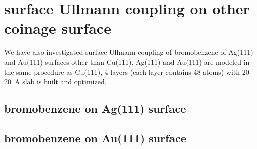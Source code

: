 \section{surface Ullmann coupling on other coinage surface}
We have also investigated surface Ullmann coupling of bromobenzene of Ag(111) and Au(111) surfaces other than Cu(111). Ag(111) and Au(111) are modeled in the same procedure as Cu(111), 4 layers (each layer contains 48 atoms) with 20 \SI{20}{\angstrom} slab is built and optimized.




\subsection{bromobenzene on Ag(111) surface}















\subsection{bromobenzene on Au(111) surface}